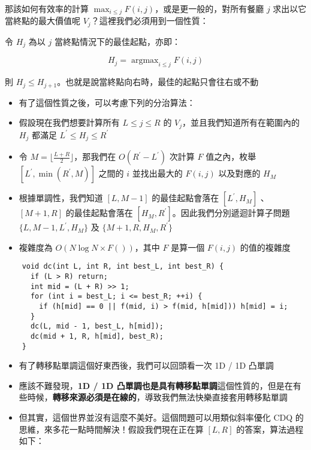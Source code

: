 \documentclass[standalone]{beamer}
\begin{document}
\begin{frame}{}
  那該如何有效率的計算 $\max_{i \leq j}F(i, j)$，或是更一般的，對所有餐廳 $j$ 求出以它當終點的最大價值呢 $V_j$？這裡我們必須用到一個性質：
  \begin{theorem}[性質]
    令 $H_j$ 為以 $j$ 當終點情況下的最佳起點，亦即：

    \[ H_j = \mathop{\arg\max}_{i \leq j}F(i, j) \]

    則 $H_j \leq H_{j + 1}$。也就是說當終點向右時，最佳的起點只會往右或不動
  \end{theorem}
\end{frame}

\begin{frame}{}
\begin{itemize}
  \item 有了這個性質之後，可以考慮下列的分治算法：
  \item 假設現在我們想要計算所有 $L \leq j \leq R$ 的 $V_j$，並且我們知道所有在範圍內的 $H_j$ 都滿足 $L^\prime \leq H_j \leq R^\prime$ 
  \item 令 $M = \lfloor\frac{L + R}{2}\rfloor$，那我們在 $O(R^\prime - L^\prime)$ 次計算 $F$ 值之內，枚舉 $[L^\prime, \min(R^\prime, M)]$ 之間的 $i$ 並找出最大的 $F(i, j)$ 以及對應的 $H_M$
  \item 根據單調性，我們知道 $[L, M - 1]$ 的最佳起點會落在 $[L^\prime, H_M]$ 、 $[M + 1, R]$ 的最佳起點會落在 $[H_M, R^\prime]$。因此我們分別遞迴計算子問題 $\{L, M - 1, L^\prime, H_M\}$ 及 $\{M + 1, R, H_M, R^\prime\}$
  \item 複雜度為 $O(N \log N \times F())$，其中 $F$ 是算一個 $F(i, j)$ 的值的複雜度
\end{itemize}
\end{frame}

\begin{frame}[fragile]{}
  \begin{verbatim}
    void dc(int L, int R, int best_L, int best_R) {
      if (L > R) return;
      int mid = (L + R) >> 1;
      for (int i = best_L; i <= best_R; ++i) {
        if (h[mid] == 0 || f(mid, i) > f(mid, h[mid])) h[mid] = i;
      }
      dc(L, mid - 1, best_L, h[mid]);
      dc(mid + 1, R, h[mid], best_R);
    }
  \end{verbatim}
\end{frame}

\begin{frame}{}
  \begin{itemize}
    \item 有了轉移點單調這個好東西後，我們可以回頭看一次 1D / 1D 凸單調
    \item 應該不難發現，\textbf{1D / 1D 凸單調也是具有轉移點單調}這個性質的，但是在有些時候，\textbf{轉移來源必須是在線的}，導致我們無法快樂直接套用轉移點單調
    \item 但其實，這個世界並沒有這麼不美好。這個問題可以用類似斜率優化 CDQ 的思維，來多花一點時間解決！假設我們現在正在算 $[L, R]$ 的答案，算法過程如下：
  \end{itemize}
\end{frame}
\end{document}
